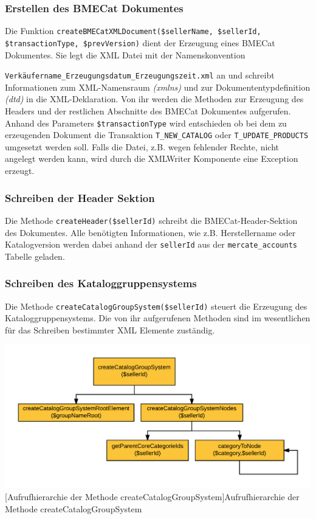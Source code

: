 	
	
	
	
	\subsubsection{Erstellen des BMECat Dokumentes}
	
	Die Funktion \texttt{createBMECatXMLDocument(\$sellerName, \$sellerId, \$transactionType, \$prevVersion)} dient der Erzeugung eines BMECat Dokumentes. Sie legt die XML Datei mit der Namenskonvention {\texttt{Verkäufername\_Erzeugungsdatum\_Erzeugungszeit.xml} an und  schreibt Informationen zum XML-Namensraum \textit{(xmlns)} und zur Dokumententypdefinition \textit{(dtd)} in die XML-Deklaration. Von ihr werden die Methoden zur Erzeugung des Headers und der restlichen Abschnitte des BMECat Dokumentes aufgerufen.
	Anhand des Parameters \texttt{\$transactionType} wird entschieden ob bei dem zu erzeugenden Dokument die Transaktion \texttt{T\_NEW\_CATALOG} oder \texttt{T\_UPDATE\_PRODUCTS} umgesetzt werden soll. Falls die Datei, z.B. wegen fehlender Rechte, nicht angelegt werden kann, wird durch die XMLWriter Komponente eine Exception erzeugt.
	
	\subsubsection{Schreiben der Header Sektion}

	Die Methode \texttt{createHeader(\$sellerId)} schreibt die BMECat-Header-Sektion des Dokumentes. Alle benötigten Informationen, wie z.B. Herstellername oder Katalogversion werden dabei anhand der \texttt{sellerId} aus der \texttt{mercate\_accounts} Tabelle geladen.
	
	\subsubsection{Schreiben des Kataloggruppensystems}
	
	Die Methode \texttt{createCatalogGroupSystem(\$sellerId)} steuert die Erzeugung des Kataloggruppensystems. Die von ihr aufgerufenen Methoden sind im wesentlichen für das Schreiben bestimmter XML Elemente zuständig.\\
	\begin{minipage}{\linewidth}
		\vspace{1em}
		\centering
		\includegraphics[width=0.7 \linewidth]{img/CreateCatalogGroupSystemHierarchie}
		[Aufrufhierarchie der Methode createCatalogGroupSystem]{Aufrufhierarchie der Methode createCatalogGroupSystem}
		\vspace{1em}
	\end{minipage}
	
}
